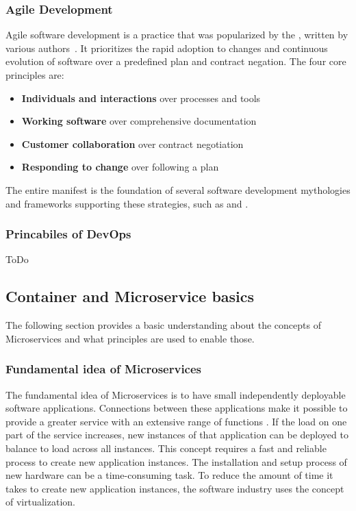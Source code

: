 \documentclass[12pt, a4paper]{article}
\begin{document}
        \subsubsection{Agile Development}
        Agile software development is a practice that was popularized by the , written by various authors~\cite{manifesto}. It prioritizes the rapid adoption to changes and continuous evolution of software over a predefined plan and contract negation.
        The four core principles are:

        \begin{itemize}[label=\(\star\)]
            \item \textbf{Individuals and interactions} over processes and tools
            \item \textbf{Working software} over comprehensive documentation
            \item \textbf{Customer collaboration} over contract negotiation
            \item \textbf{Responding to change} over following a plan
        \end{itemize}

        \noindent The entire manifest is the foundation of several software development mythologies and frameworks supporting these strategies, such as  and .
        \subsubsection{Princabiles of DevOps}
        ToDo

    \subsection{Container and Microservice basics}
    The following section provides a basic understanding about the concepts of Microservices and what principles are used to enable those.
        \subsubsection{Fundamental idea of Microservices}
        The fundamental idea of Microservices is to have small independently deployable software applications. Connections between these applications make it possible to provide a greater service with an extensive range of functions \cite{micro}. If the load on one part of the service increases, new instances of that application can be deployed to balance to load across all instances. This concept requires a fast and reliable process to create new application instances.\newline
        The installation and setup process of new hardware can be a time-consuming task. To reduce the amount of time it takes to create new application instances, the software industry uses the concept of virtualization.
\end{document}
